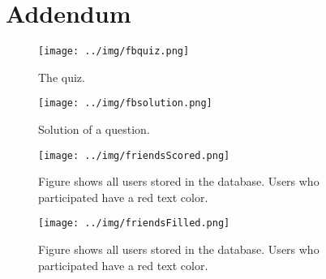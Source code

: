 \documentclass[preprint,12pt]{elsarticle}
\begin{document}












\newpage
\section{Addendum}
\label{sec:addendum}

\begin{figure}
  \texttt{[image: ../img/fbquiz.png]}
 \caption{The quiz.}
\label{fig:quiz}
\end{figure}


\begin{figure}
  \texttt{[image: ../img/fbsolution.png]}
  \caption{Solution of a question.}
\label{fig:solution}
\end{figure}




\begin{figure}
  \texttt{[image: ../img/friendsScored.png]}
\caption{Figure shows all users stored in the database. Users who
  participated have a red text color.}
\label{fig:friendsScored}
\end{figure}

\begin{figure}
  \texttt{[image: ../img/friendsFilled.png]}
\caption{Figure shows all users stored in the database. Users who
  participated have a red text color.}
\label{fig:friendsFilled}
\end{figure}
\end{document}
